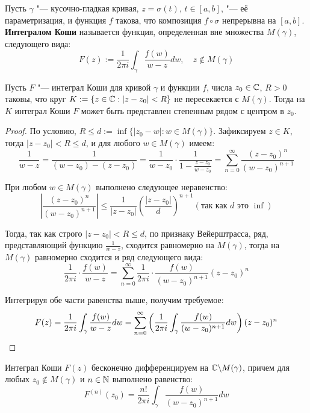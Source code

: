 \begin{definition}
	Пусть $\gamma$ "--- кусочно-гладкая кривая, $z = \sigma(t)$, $t \in [a, b]$, "--- её параметризация, и функция $f$ такова, что композиция $f\circ\sigma$ непрерывна на $[a, b]$. \textbf{Интегралом Коши} называется функция, определенная вне множества $M(\gamma)$, следующего вида:
	\[F(z) := \frac1{2\pi i}\int_\gamma \frac{f(w)}{w - z}dw, \quad z \not \in M(\gamma)\]
\end{definition}

\begin{theorem}\label{cauchy-curve-integral}
 	Пусть $F$ "--- интеграл Коши для кривой $\gamma$ и функции $f$, числа $z_0 \in \mathbb{C}$, $R > 0$ таковы, что круг $K := \{z \in \mathbb{C}: |z - z_0| < R\}$ не пересекается с $M(\gamma)$. Тогда на $K$ интеграл Коши $F$ может быть представлен степенным рядом с центром в $z_0$.
\end{theorem}

\begin{proof}
	По условию, $R \le d := \inf\{|z_0 - w| : w \in M(\gamma)\}$. Зафиксируем $z \in K$, тогда $|z - z_0| < R \le d$, и для любого $w \in M(\gamma)$ имеем:
	\[\frac1{w - z} = \frac1{(w-z_0) - (z - z_0)} = \frac1{w-z_0}\cdot \frac1{1 - \frac{z-z_0}{w - z_0}} = \sum_{n=0}^\infty\frac{(z-z_0)^n}{(w-z_0)^{n + 1}}\]
	
	При любом $w \in M(\gamma)$ выполнено следующее неравенство:
	\[\left|\frac{(z-z_0)^n}{(w-z_0)^{n + 1}}\right| \le \frac{1}{|z - z_0|}\left(\frac{|z - z_0|}{d}\right)^{n+1} (\text{так как $d$ это $\inf$})\]
	
	Тогда, так как строго $|z - z_0| < R \le d$, по признаку Вейерштрасса, ряд, представляющий функцию $\frac1{w - z}$, сходится равномерно на $M(\gamma)$, тогда на $M(\gamma)$ равномерно сходится и ряд следующего вида:
	\[\frac1{2\pi i} \cdot\frac{f(w)}{w-z} = \sum_{n=0}^\infty\frac1{2\pi i}\cdot \frac{f(w)}{(w-z_0)^{n + 1}}(z-z_0)^n\]
	
	Интегрируя обе части равенства выше, получим требуемое:
	\[F(z) = \frac1{2\pi i} \int_\gamma \frac{f(w)}{w-z}dw = \sum_{n=0}^\infty\left(\frac1{2\pi i} \int_\gamma\frac{f(w)}{(w-z_0)^{n + 1}}dw\right)(z-z_0)^n \qedhere\]
\end{proof}

\begin{corollary}
	Интеграл Коши $F(z)$ бесконечно дифференцируем на $\mathbb{C} \backslash M(\gamma)$, причем для любых $z_0 \not \in M(\gamma)$ и $n \in \mathbb{N}$ выполнено равенство:
	\[F^{(n)}(z_0) = \frac{n!}{2\pi i} \int_\gamma\frac{f(w)}{(w-z_0)^{n + 1}}dw\]
\end{corollary}

